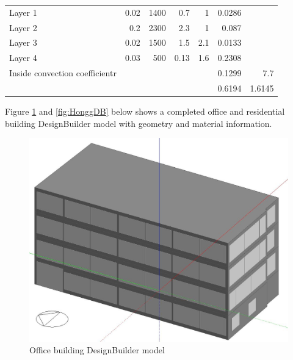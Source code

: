 \documentclass[11pt, a4paper]{article}
\theoremstyle{definition}
\begin{document}
\begin{table}[h!]
\begin{tabular}{rrrrrrr}
			    \multicolumn{1}{l}{Layer 1} & 0.02 & 1400 & 0.7  & 1    & 0.0286 &  \\
			    \multicolumn{1}{l}{Layer 2} & 0.2  & 2300 & 2.3  & 1    & 0.087 &  \\
			    \multicolumn{1}{l}{Layer 3} & 0.02 & 1500 & 1.5  & 2.1  & 0.0133 &  \\
			    \multicolumn{1}{l}{Layer 4} & 0.03 & 500  & 0.13 & 1.6  & 0.2308 &  \\
			    \multicolumn{1}{l}{Inside convection coefficientr} &      &      &      &      & 0.1299 & 7.7 \\
			         &      &      &      &      & 0.6194 & 1.6145 \\
			    \bottomrule
			    \end{tabular}%
			  \label{tab:HonggerWallMat}%
			\end{table}%

		Figure \ref{fig:SumatraDB} and \ref{fig:HonggDB} below shows a completed office and residential building DesignBuilder model with geometry and material information.\\

			\begin{figure}[H]
			\centering
			\includegraphics[scale=0.45]{SumatraDesignBuilderModel.JPG}
			\caption{Office building DesignBuilder model}
			\label{fig:SumatraDB}
			\end{figure}
\end{document}
